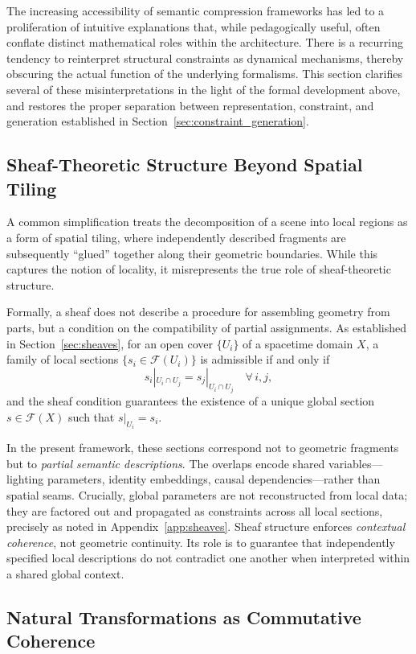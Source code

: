 \documentclass[11pt,a4paper]{article}
\theoremstyle{definition}
\theoremstyle{remark}
\begin{document}
The increasing accessibility of semantic compression frameworks has led to a proliferation of intuitive explanations that, while pedagogically useful, often conflate distinct mathematical roles within the architecture. There is a recurring tendency to reinterpret structural constraints as dynamical mechanisms, thereby obscuring the actual function of the underlying formalisms. This section clarifies several of these misinterpretations in the light of the formal development above, and restores the proper separation between representation, constraint, and generation established in Section~\ref{sec:constraint_generation}.

\subsection{Sheaf-Theoretic Structure Beyond Spatial Tiling}

A common simplification treats the decomposition of a scene into local regions as a form of spatial tiling, where independently described fragments are subsequently ``glued'' together along their geometric boundaries. While this captures the notion of locality, it misrepresents the true role of sheaf-theoretic structure.

Formally, a sheaf does not describe a procedure for assembling geometry from parts, but a condition on the compatibility of partial assignments. As established in Section~\ref{sec:sheaves}, for an open cover $\{U_i\}$ of a spacetime domain $X$, a family of local sections $\{s_i \in \mathcal{F}(U_i)\}$ is admissible if and only if
\[
s_i|_{U_i \cap U_j} = s_j|_{U_i \cap U_j} \quad \forall\, i,j,
\]
and the sheaf condition guarantees the existence of a unique global section $s \in \mathcal{F}(X)$ such that $s|_{U_i} = s_i$.

In the present framework, these sections correspond not to geometric fragments but to \emph{partial semantic descriptions}. The overlaps encode shared variables---lighting parameters, identity embeddings, causal dependencies---rather than spatial seams. Crucially, global parameters are not reconstructed from local data; they are factored out and propagated as constraints across all local sections, precisely as noted in Appendix~\ref{app:sheaves}. Sheaf structure enforces \emph{contextual coherence}, not geometric continuity. Its role is to guarantee that independently specified local descriptions do not contradict one another when interpreted within a shared global context.

\subsection{Natural Transformations as Commutative Coherence}
\end{document}

